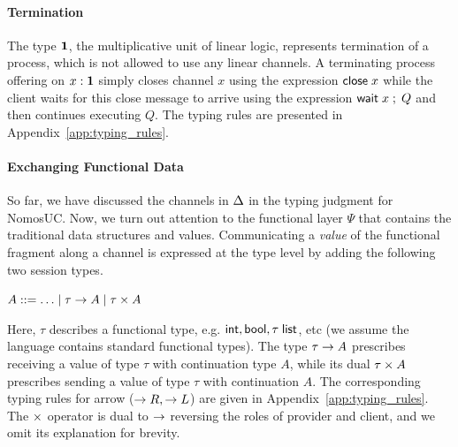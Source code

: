 \paragraph*{\textbf{Termination}}
The type $\mathbf{1}$, the multiplicative unit of linear logic, represents
termination of a process, which is not allowed to use
any linear channels. A terminating process offering on $x : \mathbf{1}$ simply
closes channel $x$ using the expression $\mathsf{close} \; x$ while the client waits
for this close message to arrive using the expression $\mathsf{wait} \; x \; ; \; Q$
and then continues executing $Q$.
The typing rules are presented in Appendix~\ref{app:typing_rules}.


\paragraph*{\textbf{Exchanging Functional Data}}
So far, we have discussed the channels in $\Delta$ in the typing judgment for NomosUC.
Now, we turn out attention to the functional layer $\Psi$ that contains the
traditional data structures and values.
Communicating a \emph{value} of the functional fragment along a channel
is expressed at the type level by adding the following two session types.
\begin{center}
\begin{minipage}{0cm}
\begin{tabbing}
$A ::= \ldots \mid \tau \rightarrow A \mid \tau \times A$
\end{tabbing}
\end{minipage}
\end{center}
Here, $\tau$ describes a functional type, e.g. $\mathsf{int}, \mathsf{bool}, \tau \; \mathsf{list}$, etc
(we assume the language contains standard functional types).
The type $\tau \rightarrow A$ prescribes receiving a value of type $\tau$
with continuation type $A$, while its dual $\tau \times A$ prescribes
sending a value of type $\tau$ with continuation $A$. The corresponding
typing rules for arrow ($\rightarrow R, \rightarrow L$) are given in Appendix~\ref{app:typing_rules}.
The $\times$ operator is dual to $\rightarrow$ reversing the roles of provider and client,
and we omit its explanation for brevity.

